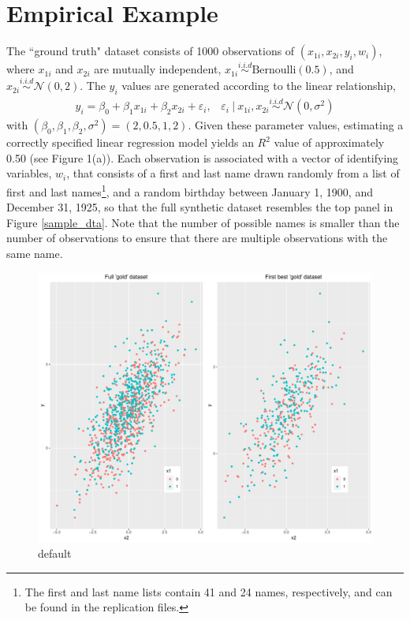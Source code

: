 \documentclass[12pt]{article}
\begin{document}
\section{Empirical Example}
The ``ground truth" dataset consists of 1000 observations of $(x_{1i}, x_{2i}, y_i, w_i)$, where $x_{1i}$ and $x_{2i}$ are mutually independent, $x_{1i} \overset{i.i.d}{\sim} \text{Bernoulli}(0.5)$, and $x_{2i} \overset{i.i.d}{\sim} \mathcal{N}(0, 2)$.  The $y_i$ values are generated according to the linear relationship,
\begin{gather}
y_i = \beta_0 + \beta_1 x_{1i} + \beta_2 x_{2i} + \varepsilon_i, \hspace{10pt} 
\varepsilon_i\  |\  x_{1i}, x_{2i} \overset{i.i.d}{\sim} \mathcal{N}(0, \sigma^2) 
\end{gather}
with $(\beta_0, \beta_1, \beta_2, \sigma^2) = (2, 0.5, 1, 2)$.  Given these parameter values, estimating a correctly specified linear regression model yields an $R^2$ value of approximately 0.50 (see Figure 1(a)).  Each observation is associated with a vector of identifying variables, $w_i$, that consists of a first and last name drawn randomly from a list of first and last names\footnote{The first and last name lists contain 41 and 24 names, respectively, and can be found in the replication files.}, and a random birthday between January 1, 1900, and December 31, 1925, so that the full synthetic dataset resembles the top panel in Figure \ref{sample_dta}.  Note that the number of possible names is smaller than the number of observations to ensure that there are multiple observations with the same name. 
 
 
 
\begin{figure}[htbp]
\begin{center}
\includegraphics[width=\textwidth]{./Figures/gold_data_compare.pdf}
\caption{default}
\label{default}
\end{center}
\end{figure}
\end{document}
